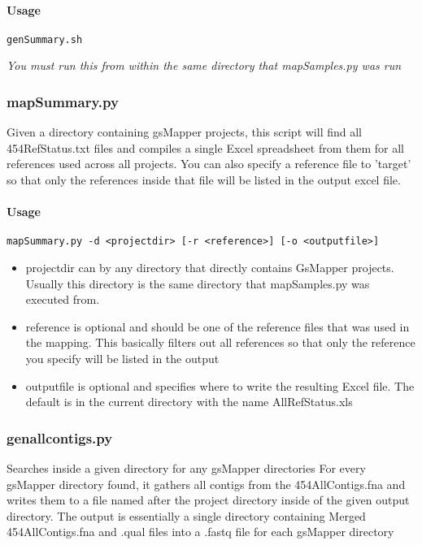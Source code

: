 \documentclass{article}
\begin{document}
\paragraph{Usage}
\begin{lstlisting}
genSummary.sh
\end{lstlisting}
\textit{You must run this from within the same directory that mapSamples.py was run}

\subsubsection{mapSummary.py}
Given a directory containing gsMapper projects, this script will find all 454RefStatus.txt files and 
compiles a single Excel spreadsheet from them for all references used across all projects.
You can also specify a reference file to 'target' so that only the references inside that file will be 
listed in the output excel file.

\paragraph{Usage}

\begin{lstlisting}
mapSummary.py -d <projectdir> [-r <reference>] [-o <outputfile>]
\end{lstlisting}
\begin{itemize}
 \item projectdir can by any directory that directly contains GsMapper projects. Usually this directory is the same directory that mapSamples.py was executed from.
 \item reference is optional and should be one of the reference files that was used in the mapping. This basically filters out all references so that only the reference you specify will be listed in the output
 \item outputfile is optional and specifies where to write the resulting Excel file. The default is in the current directory with the name AllRefStatus.xls
\end{itemize}

\subsubsection{genallcontigs.py}
Searches inside a given directory for any gsMapper directories
For every gsMapper directory found, it gathers all contigs from the 454AllContigs.fna and writes them to a file named 
after the project directory inside of the given output directory.
The output is essentially a single directory containing Merged 454AllContigs.fna and .qual files into a .fastq file for 
each gsMapper directory
\end{document}
